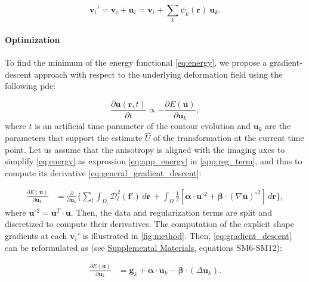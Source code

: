 \documentclass[3p,authoryear,fleqn]{elsarticle}
\providecommand{\mdist}[2]{ \mathcal{D}_{#2}^2(\mathbf{#1}) }
\renewcommand{\vec}[1]{\mathbf{#1}}
\providecommand{\suppl}[1]{\href{http://figshare.com/s/459c26b4ee8211e493b306ec4bbcf141}{Supplemental Materials}, #1}
\begin{document}
  \begin{equation}
  \vec{v}_i' = \vec{v}_i + \vec{u}_i = \vec{v}_i + \sum_k \psi_k(\vec{r}) \: \vec{u}_k.
  \label{eq:nodes_tfm}
  \end{equation}


\paragraph*{Optimization}
\label{sec:gradient_descent}
To find the minimum of the energy functional \eqref{eq:energy},
  we propose a gradient-descent approach with respect to the underlying
  deformation field using the following \gls*{pde}:

  \begin{equation}
  \frac{\partial \vec{u}(\vec{r},t)}{\partial t} \propto - \frac{\partial E(\vec{u})}{\partial \vec{u}_k},
  \label{eq:general_gradient_descent}
  \end{equation}
  where $t$ is an artificial time parameter of the contour
  evolution and $\vec{u}_k$ are the parameters that support the estimate
  $\hat{U}$ of the transformation at the current time point.
Let us assume that the anisotropy is aligned with the imaging axes to simplify
  \eqref{eq:energy} as expression \eqref{eq:app_energy} in \ref{app:reg_term},
  and thus to compute its derivative \eqref{eq:general_gradient_descent}:

  \begin{align}
  \frac{\partial E(\vec{u})}{\partial \vec{u}_k} &=
  \frac{ \partial }{\partial \vec{u}_k} \Big\{
  \underset{l}{\sum} \int_{\Omega_l} \mdist{f'}{l} \,d\vec{r} \, +   \int_{\Omega} \frac12 [ \boldsymbol{\alpha} \cdot \vec{u}^{\circ2}
  + \boldsymbol{\beta} \cdot (\nabla \vec{u})^{\circ2} ] \,d\vec{r}
  \Big\},
  \label{eq:gradient_descent}
  \end{align}
  where $\vec{u}^{\circ2} = \vec{u}^T \cdot \vec{u}$.
Then, the data and regularization terms are split and discretized to compute their
  derivatives.
The computation of the explicit shape gradients at each $\vec{v}_i'$ is illustrated in \autoref{fig:method}.
Then, \eqref{eq:gradient_descent} can be reformulated as (see \suppl{equations SM6-SM12}):

  \begin{align}
  \frac{\partial E(\vec{u})}{\partial \vec{u}_k} &=
  \vec{g}_k  + \boldsymbol{\alpha} \cdot \vec{u}_k - \boldsymbol{\beta} \cdot (\Delta \vec{u}_k).
  \label{eq:final_gradient}
  \end{align}
\end{document}
